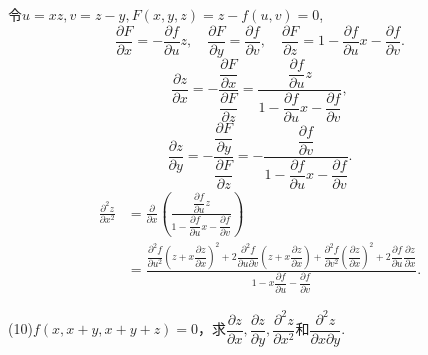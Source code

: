 \documentclass[12pt, a4paper]{article}
\begin{document}
令\(u = xz, v = z - y, F(x, y, z) = z - f(u, v) = 0\),
\[\frac{\partial F}{\partial x} = -\frac{\partial f}{\partial u} z, \quad \frac{\partial F}{\partial y} = \frac{\partial f}{\partial v}, \quad \frac{\partial F}{\partial z} = 1 - \frac{\partial f}{\partial u} x - \frac{\partial f}{\partial v}.\]
\[\frac{\partial z}{\partial x} = -\frac{\dfrac{\partial F}{\partial x}}{\dfrac{\partial F}{\partial z}} = \frac{\dfrac{\partial f}{\partial u} z}{1 - \dfrac{\partial f}{\partial u} x - \dfrac{\partial f}{\partial v}},\]
\[\frac{\partial z}{\partial y} = -\frac{\dfrac{\partial F}{\partial y}}{\dfrac{\partial F}{\partial z}} = -\frac{\dfrac{\partial f}{\partial v}}{1 - \dfrac{\partial f}{\partial u} x - \dfrac{\partial f}{\partial v}}.\]
\begin{align*}
\frac{\partial^2 z}{\partial x^2} &= \frac{\partial}{\partial x} \left( \frac{\dfrac{\partial f}{\partial u} z}{1 - \dfrac{\partial f}{\partial u} x - \dfrac{\partial f}{\partial v}} \right) \\
&= \frac{\dfrac{\partial^2 f}{\partial u^2}\left(z + x\dfrac{\partial z}{\partial x}\right)^2 + 2\dfrac{\partial^2 f}{\partial u \partial v}\left(z + x\dfrac{\partial z}{\partial x}\right) + \dfrac{\partial^2 f}{\partial v^2}\left(\dfrac{\partial z}{\partial x}\right)^2 + 2\dfrac{\partial f}{\partial u}\dfrac{\partial z}{\partial x}}{1 - x\dfrac{\partial f}{\partial u} - \dfrac{\partial f}{\partial v}}.
\end{align*}

(10)\(f(x, x + y, x + y + z) = 0\)，求\(\dfrac{\partial z}{\partial x}, \dfrac{\partial z}{\partial y}, \dfrac{\partial^2 z}{\partial x^2}\)和\(\dfrac{\partial^2 z}{\partial x \partial y}\).
\end{document}
